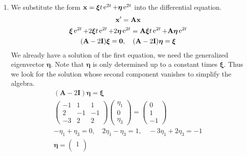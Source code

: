{\begin{Solution}
\begin{enumerate}
\begin{enumerate}
\[\begin{pmatrix}
        0 \\
        1 \\
        -1
      \end{pmatrix}
      \e^{2 t}.
      \]
    \item
      We substitute the form $\mathbf{x} = \boldsymbol{\xi} t \mathop{\mathrm{e}}\nolimits^{2t} + \boldsymbol{\eta} \mathop{\mathrm{e}}\nolimits^{2 t}$ into 
      the differential equation.
      \begin{gather*}
        \mathbf{x}' = \mathbf{A} \mathbf{x} \\
        \boldsymbol{\xi} \mathop{\mathrm{e}}\nolimits^{2 t} + 2 \boldsymbol{\xi} t \mathop{\mathrm{e}}\nolimits^{2 t} + 2 \boldsymbol{\eta} \mathop{\mathrm{e}}\nolimits^{2 t} 
        = \mathbf{A} \boldsymbol{\xi} t \mathop{\mathrm{e}}\nolimits^{2t} + \mathbf{A} \boldsymbol{\eta} \mathop{\mathrm{e}}\nolimits^{2 t} \\
        (\mathbf{A} - 2 \mathbf{I}) \boldsymbol{\xi} = \mathbf{0}, \quad 
        (\mathbf{A} - 2 \mathbf{I}) \boldsymbol{\eta} = \boldsymbol{\xi}
      \end{gather*}
      We already have a solution of the first equation, we need the generalized
      eigenvector $\boldsymbol{\eta}$.  Note that $\boldsymbol{\eta}$ is only determined up to a 
      constant times $\boldsymbol{\xi}$.  Thus we look for the solution whose second component 
      vanishes to simplify the algebra.
      \begin{gather*}
        (\mathbf{A} - 2 \mathbf{I}) \boldsymbol{\eta} = \boldsymbol{\xi} \\
        \begin{pmatrix}
          -1 & 1 & 1\\
          2 & -1 & -1\\
          -3 & 2 & 2
        \end{pmatrix}
        \begin{pmatrix}
          \eta_1 \\
          0 \\
          \eta_3
        \end{pmatrix}
        =
        \begin{pmatrix}
          0 \\
          1 \\
          -1
        \end{pmatrix} \\
        - \eta_1 + \eta_3 = 0, \quad 2 \eta_1 - \eta_3 = 1, \quad -3 \eta_1 + 2 \eta_3 = -1 \\
        \boldsymbol{\eta} = 
        \begin{pmatrix}
          1 \\

\end{pmatrix}
\end{gather*}
\end{enumerate}
\end{enumerate}
\end{Solution}}
